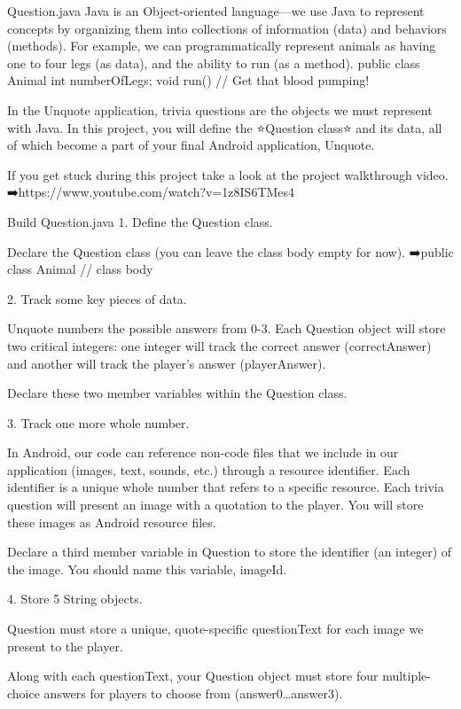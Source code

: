 Question.java
    Java is an Object-oriented language—we use Java to represent concepts by organizing them into collections of information (data) and behaviors (methods). For example, we can programmatically represent animals as having one to four legs (as data), and the ability to run (as a method).
        public class Animal {
            int numberOfLegs;
            void run() {
            // Get that blood pumping!
            }
        }

    In the Unquote application, trivia questions are the objects we must represent with Java. In this project, you will define the ⭐Question class⭐ and its data, all of which become a part of your final Android application, Unquote.

    If you get stuck during this project take a look at the project walkthrough video.
        ➡️https://www.youtube.com/watch?v=1z8IS6TMes4

Build Question.java
    1.
    Define the Question class.

    Declare the Question class (you can leave the class body empty for now).
      ➡️public class Animal {
            // class body
        }

    2.
    Track some key pieces of data.

    Unquote numbers the possible answers from 0-3. Each Question object will store two critical integers: one integer will track the correct answer (correctAnswer) and another will track the player’s answer (playerAnswer).

    Declare these two member variables within the Question class.

    3.
    Track one more whole number.

    In Android, our code can reference non-code files that we include in our application (images, text, sounds, etc.) through a resource identifier. Each identifier is a unique whole number that refers to a specific resource. Each trivia question will present an image with a quotation to the player. You will store these images as Android resource files.

    Declare a third member variable in Question to store the identifier (an integer) of the image. You should name this variable, imageId.

    4.
    Store 5 String objects.

    Question must store a unique, quote-specific questionText for each image we present to the player.

    Along with each questionText, your Question object must store four multiple-choice answers for players to choose from (answer0…answer3).

